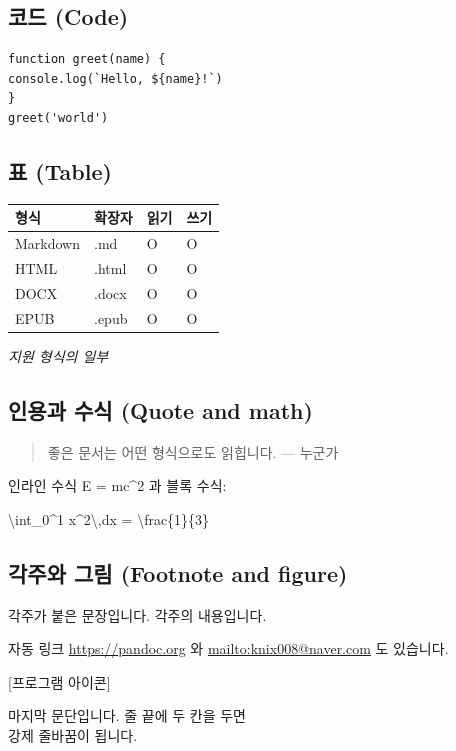 \documentclass[11pt]{article}
\begin{document}
\subsection*{코드 (Code)}\label{코드-code}

\begin{verbatim}
function greet(name) {
console.log(`Hello, ${name}!`)
}
greet('world')
\end{verbatim}

\subsection*{표 (Table)}\label{표-table}

\begin{table}[htbp]
\centering
\begin{tabular}{llll}
\toprule
\textbf{형식} & \textbf{확장자} & \textbf{읽기} & \textbf{쓰기} \\
\midrule
Markdown & .md & O & O \\
HTML & .html & O & O \\
DOCX & .docx & O & O \\
EPUB & .epub & O & O \\
\bottomrule
\end{tabular}
\end{table}

\emph{지원 형식의 일부}

\subsection*{인용과 수식 (Quote and math)}\label{인용과-수식-quote-and-math}

\begin{quote}
좋은 문서는 어떤 형식으로도 읽힙니다. --- 누군가
\end{quote}

인라인 수식 E = mc\^{}2 과 블록 수식:

\textbackslash{}int\_0\^{}1 x\^{}2\textbackslash{},dx =
\textbackslash{}frac\{1\}\{3\}

\subsection*{각주와 그림 (Footnote and figure)}\label{각주와-그림-footnote-and-figure}

각주가 붙은 문장입니다. 각주의 내용입니다.

자동 링크 \underline{https://pandoc.org} 와
\underline{mailto:knix008@naver.com} 도 있습니다.

[프로그램 아이콘]

마지막 문단입니다. 줄 끝에 두 칸을 두면\\
강제 줄바꿈이 됩니다.
\end{document}
